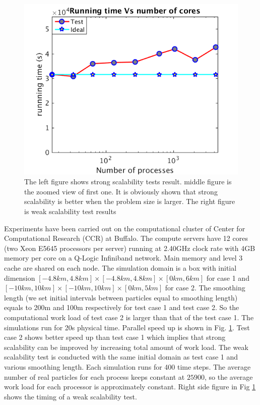 \begin{figure}[!t]
\includegraphics[scale=0.31]{Chapter-5/Figures/weak_scale}
\caption{The left figure shows strong scalability tests result. middle figure is the zoomed view of first one. It is obviously shown that strong scalability is better when the problem size is larger. The right figure is weak scalability test results}
\label{fig:2cases_efficiency}
\end{figure}
%
Experiments have been carried out on the computational cluster of Center for Computational Research (CCR) at Buffalo. 
The compute servers have 12 cores (two Xeon E5645 processors per server) running at 2.40GHz clock rate with 4GB memory per core on a Q-Logic Infiniband network. Main memory and level 3 cache are shared on each node. The simulation domain is a box with initial dimension $[-4.8km, 4.8km]\times [-4.8km, 4.8km] \times [0km, 6km]$ for case 1 and $[-10km, 10km]\times [-10km, 10km] \times [0km, 5km]$ for case 2. The smoothing length (we set initial intervals between particles equal to smoothing length) equals to 200m and 100m respectively for test case 1 and test case 2. So the computational work load of test case 2 is larger than that of the test case 1. The simulations run for 20s physical time.  Parallel speed up is shown in Fig. \ref{fig:2cases_efficiency}. Test case 2 shows better speed up than test case 1 which implies that strong scalability can be improved by increasing total amount of work load.
The weak scalability test is conducted with the same initial domain as test case 1 and various smoothing length. Each simulation runs for 400 time steps. The average number of real particles for each process keeps constant at $25900$, so the average work load for each processor is approximately constant. 
Right side figure in Fig \ref{fig:2cases_efficiency} shows the timing of a weak scalability test.\\

